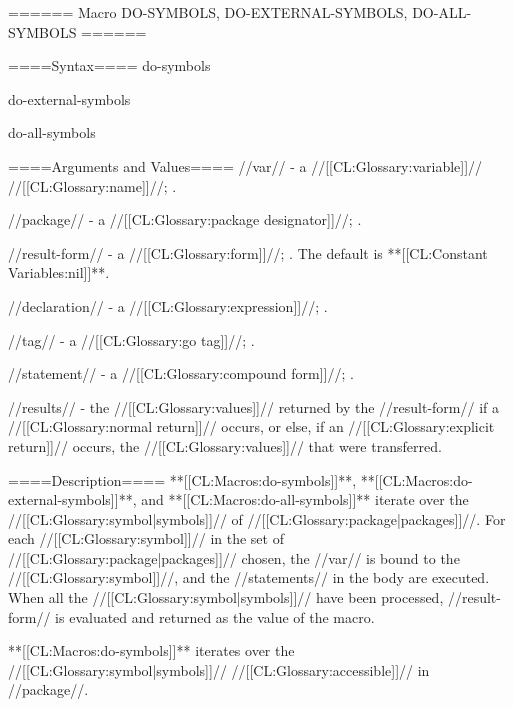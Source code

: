 ====== Macro DO-SYMBOLS, DO-EXTERNAL-SYMBOLS, DO-ALL-SYMBOLS ======

====Syntax====
\DefmacWithValuesNewline do-symbols {} {}

\DefmacWithValuesNewline do-external-symbols {} {}

\DefmacWithValuesNewline do-all-symbols {} {}

====Arguments and Values====
//var// - a //[[CL:Glossary:variable]]// //[[CL:Glossary:name]]//; \noeval.


//package// - a //[[CL:Glossary:package designator]]//; \eval.


//result-form// - a //[[CL:Glossary:form]]//; \evalspecial. The default is **[[CL:Constant Variables:nil]]**.

//declaration// - a  //[[CL:Glossary:expression]]//; \noeval.

//tag// - a //[[CL:Glossary:go tag]]//; \noeval.

//statement// - a //[[CL:Glossary:compound form]]//; \evalspecial.

//results// - the //[[CL:Glossary:values]]// returned by the //result-form// if a //[[CL:Glossary:normal return]]// occurs, or else, if an //[[CL:Glossary:explicit return]]// occurs, the //[[CL:Glossary:values]]// that were transferred.

====Description====
**[[CL:Macros:do-symbols]]**, **[[CL:Macros:do-external-symbols]]**, and **[[CL:Macros:do-all-symbols]]** iterate over the //[[CL:Glossary:symbol|symbols]]// of //[[CL:Glossary:package|packages]]//. For each //[[CL:Glossary:symbol]]// in the set of //[[CL:Glossary:package|packages]]// chosen, the //var// is bound to the //[[CL:Glossary:symbol]]//, and the //statements// in the body are executed. When all the //[[CL:Glossary:symbol|symbols]]// have been processed, //result-form// is evaluated and returned as the value of the macro.

**[[CL:Macros:do-symbols]]** iterates over the //[[CL:Glossary:symbol|symbols]]// //[[CL:Glossary:accessible]]// in //package//.

